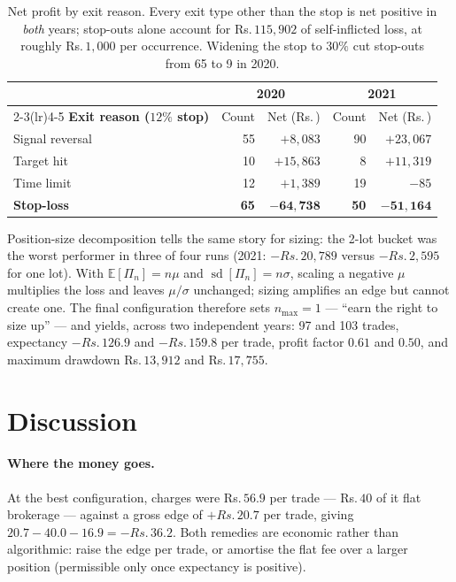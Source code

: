 \documentclass[10pt,a4paper]{article}
\newcommand{\rs}{Rs.\,}
\begin{document}
\begin{table}[H]
\centering\small
\begin{tabular}{@{}lrrrr@{}}
\toprule
& \multicolumn{2}{c}{\textbf{2020}} & \multicolumn{2}{c}{\textbf{2021}}\\
\cmidrule(lr){2-3}\cmidrule(lr){4-5}
\textbf{Exit reason ($12\%$ stop)} & Count & Net (\rs) & Count & Net (\rs)\\
\midrule
Signal reversal & 55 & $+8{,}083$ & 90 & $+23{,}067$\\
Target hit      & 10 & $+15{,}863$ & 8 & $+11{,}319$\\
Time limit      & 12 & $+1{,}389$ & 19 & $-85$\\
\textbf{Stop-loss} & \textbf{65} & $\mathbf{-64{,}738}$ & \textbf{50} &
$\mathbf{-51{,}164}$\\
\bottomrule
\end{tabular}
\caption{Net profit by exit reason. Every exit type other than the stop is net
positive in \emph{both} years; stop-outs alone account for \rs$115{,}902$ of
self-inflicted loss, at roughly \rs$1{,}000$ per occurrence. Widening the stop
to $30\%$ cut stop-outs from 65 to 9 in 2020.}
\label{tab:exits}
\end{table}

Position-size decomposition tells the same story for sizing: the 2-lot bucket
was the worst performer in three of four runs (2021: $-\rs20{,}789$ versus
$-\rs2{,}595$ for one lot). With $\mathbb{E}[\Pi_n]=n\mu$ and
$\operatorname{sd}[\Pi_n]=n\sigma$, scaling a negative $\mu$ multiplies the
loss and leaves $\mu/\sigma$ unchanged; sizing amplifies an edge but cannot
create one. The final configuration therefore sets $n_{\max}=1$ --- ``earn the
right to size up'' --- and yields, across two independent years: 97 and 103
trades, expectancy $-\rs126.9$ and $-\rs159.8$ per trade, profit factor $0.61$
and $0.50$, and maximum drawdown \rs$13{,}912$ and \rs$17{,}755$.

\section{Discussion}

\paragraph{Where the money goes.} At the best configuration, charges were
\rs$56.9$ per trade --- \rs$40$ of it flat brokerage --- against a gross edge of
$+\rs20.7$ per trade, giving $20.7-40.0-16.9=-\rs36.2$. Both remedies are
economic rather than algorithmic: raise the edge per trade, or amortise the
flat fee over a larger position (permissible only once expectancy is positive).
\end{document}
